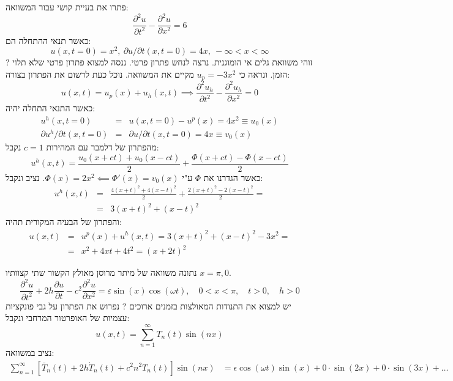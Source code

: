\documentclass{tstextbook}
\begin{document}
פתרו את בעיית קושי עבור המשוואה:
$$ \frac{\partial^2u}{\partial t^2}-\frac{\partial^2u}{\partial x^2}=6$$
כאשר תנאי ההתחלה הם:
$$ u\left(x,t=0\right)=x^{2},\:\partial u/\partial t\left(x,t=0\right)=4x,\:-\infty<x<\infty $$
?
זוהי משוואת גלים אי הומוגנית. נרצה לנחש פתרון פרטי. ננסה למצוא פתרון פרטי שלא תלוי הזמן. ונראה כי \(u_{p}=-3x^2\) מקיים את המשוואה. נוכל כעת לרשום את הפתרון בצורה:
$$u(x,t)=u_{p}(x)+u_{h}(x,t)\implies \frac{\partial^2 u_{h}}{\partial t^2}-\frac{\partial ^2u_{h}}{\partial x^2}=0$$
כאשר התנאי התחלה יהיה:
$$ \begin{array}{rcl}u^{h}\left(x,t=0\right)&=&u\left(x,t=0\right)-u^{p}\left(x\right)=4x^{2}\equiv u_{0}\left(x\right)\\\partial u^{h}/\partial t\left(x,t=0\right)&=&\partial u/\partial t\left(x,t=0\right)=4x\equiv v_{0}\left(x\right)\end{array}$$
מהפתרון של דלמבר עם המהירות \(c=1\) נקבל:
$$ u^{h}\left(x,t\right)=\frac{u_{0}\left(x+ct\right)+u_{0}\left(x-ct\right)}{2}+\frac{\Phi\left(x+ct\right)-\Phi\left(x-ct\right)}{2}$$
כאשר הגדרנו את \(\Phi\) ע"י \(\Phi(x)=2x^2\impliedby \Phi'(x)=v_{0}(x)\). נציב ונקבל:
$$ \begin{array}{rcl}u^h\left(x,t\right)&=&\frac{4\left(x+t\right)^2+4\left(x-t\right)^2}{2}+\frac{2\left(x+t\right)^2-2\left(x-t\right)^2}{2}=\\&=&3\left(x+t\right)^2+\left(x-t\right)^2\end{array}$$
והפתרון של הבעיה המקורית תהיה:
$$ \begin{array}{rcl}u\left(x,t\right)&=&u^p\left(x\right)+u^h\left(x,t\right)=3\left(x+t\right)^2+\left(x-t\right)^2-3x^2=\\&=&x^2+4xt+4t^2=\left(x+2t\right)^2\end{array}$$

נתונה משוואה של מיתר מרוסן מאולץ הקשור שתי קצוותיו \(x=\pi,0\). 
$$ \frac{\partial^{2}u}{\partial t^{2}}+2h\frac{\partial u}{\partial t}-c^{2}\frac{\partial^{2}u}{\partial x^{2}}=\varepsilon\sin(x)\cos(\omega t),\quad0<x<\pi,\quad t>0,\quad h>0$$
יש למצוא את התנודות המאולצות בזמנים ארוכים
?
נפרוש את הפתרון  על גבי פונקציות עצמיות של האופרטור המרחבי ונקבל:
$$ u\left(x,t\right)=\sum_{n=1}^{\infty}T_{n}\left(t\right)\sin\left(nx\right)$$
נציב במשוואה:
$$ \begin{aligned}\sum_{n=1}^{\infty}\left[\bar{T}_{n}\left(t\right)+2h\dot{T}_{n}\left(t\right)+c^{2}n^{2}T_{n}\left(t\right)\right]\sin\left(nx\right)&=\epsilon\cos\left(\omega t\right)\sin\left(x\right)+0\cdot\sin\left(2x\right)+0\cdot\sin\left(3x\right)+\ldots\end{aligned}$$
\end{document}
